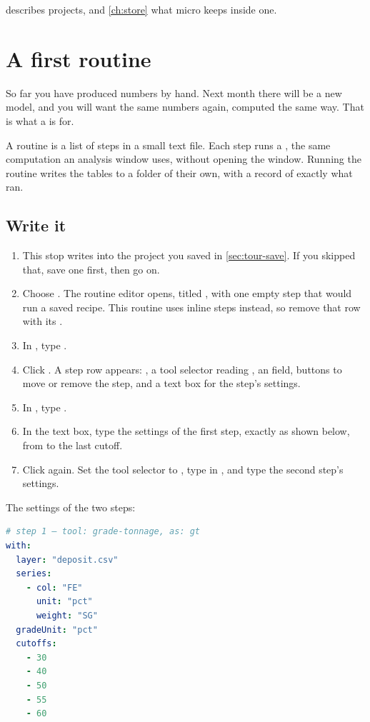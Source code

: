  describes projects, and \cref{ch:store} what micro keeps inside one.

\section{A first routine}\label{sec:tour-routine}
So far you have produced numbers by hand. Next month there will be a new model, and you will want the same numbers again, computed the same way. That is what a  is for.

A routine is a list of steps in a small text file. Each step runs a , the same computation an analysis window uses, without opening the window. Running the routine writes the tables to a folder of their own, with a record of exactly what ran.

\subsection{Write it}
\begin{tryit}
\begin{enumerate}
\item This stop writes into the project you saved in \cref{sec:tour-save}. If you skipped that, save one first, then go on.
\item Choose . The routine editor opens, titled , with one empty step that would run a saved recipe. This routine uses inline steps instead, so remove that row with its .
\item In , type .
\item Click . A step row appears: , a tool selector reading , an  field, buttons to move or remove the step, and a text box for the step's settings.
\item In , type .
\item In the text box, type the settings of the first step, exactly as shown below, from  to the last cutoff.
\item Click  again. Set the tool selector to , type  in , and type the second step's settings.
\end{enumerate}
\end{tryit}

The settings of the two steps:

\begin{lstlisting}[language=yaml]
# step 1 — tool: grade-tonnage, as: gt
with:
  layer: "deposit.csv"
  series:
    - col: "FE"
      unit: "pct"
      weight: "SG"
  gradeUnit: "pct"
  cutoffs:
    - 30
    - 40
    - 50
    - 55
    - 60
\end{lstlisting}

